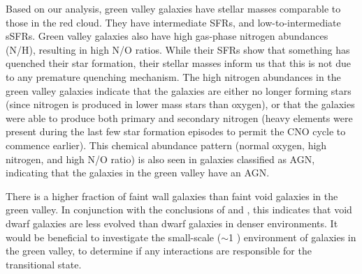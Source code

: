 Based on our analysis, green valley galaxies have stellar masses comparable to 
those in the red cloud.  They have intermediate SFRs, and low-to-intermediate 
sSFRs.  Green valley galaxies also have high gas-phase nitrogen abundances (N/H), 
resulting in high N/O ratios.  While their SFRs show that something has quenched 
their star formation, their stellar masses inform us that this is not due to any 
premature quenching mechanism.  The high nitrogen abundances in the green valley 
galaxies indicate that the galaxies are either no longer forming stars (since 
nitrogen is produced in lower mass stars than oxygen), or that the galaxies were 
able to produce both primary and secondary nitrogen (heavy elements were present 
during the last few star formation episodes to permit the CNO cycle to commence 
earlier).  This chemical abundance pattern (normal oxygen, high nitrogen, and 
high N/O ratio) is also seen in galaxies classified as AGN, indicating that the 
galaxies in the green valley have an AGN.

There is a higher fraction of faint wall galaxies than faint void galaxies in 
the green valley.  In conjunction with the conclusions of \cite{Douglass17b} and 
\cite{Douglass17c}, this indicates that void dwarf galaxies are less evolved 
than dwarf galaxies in denser environments.  It would be beneficial to 
investigate the small-scale ($\sim$1 \hMpc) environment of galaxies in the green 
valley, to determine if any interactions are responsible for the transitional 
state.